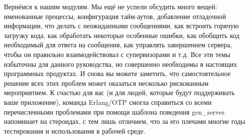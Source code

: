 Вернёмся к нашим модулям.
Мы ещё не успели обсудить много вещей: именованные процессы, конфигурация тайм\--аутов, добавление отладочной информации, что делать с неожиданными сообщениями, как встроить горячую загрузку кода, как обработать некоторые особенные ошибки, как обобщить код необходимый для ответа на сообщения, как управлять завершением сервера, чтобы он правильно взаимодействовал с супервизорами и т.д.
Все эти темы избыточны для данного руководства, но совершенно необходимы в настоящих программных продуктах.
И снова вы можете заметить, что самостоятельное решение всех этих проблем может оказаться несколько рискованным мероприятием.
К счастью для вас (и для людей, которые будут поддерживать ваше приложение), команда Erlang/OTP смогла справиться со всеми перечисленными проблемами при помощи шаблона поведения gen\_server.
 напоминает  на стероидах, с тем лишь отличием, что за его плечами многие годы тестирования и использования в рабочей среде.
